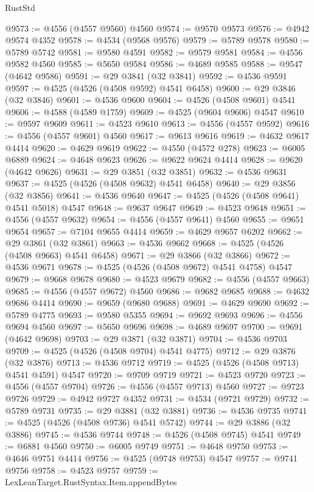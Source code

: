 \begin{lexlean}{RustStd}
\begin{coremodule}
@9573 := @4556 (@4557 @9560) @4560
@9574 := @9570 @9573
@9576 := @4942 @9574 @4352
@9578 := @4534 (@9568 @9576)
@9579 := @5789 @9578
@9580 := @5789 @5742
@9581 := @9580 @4591
@9582 := @9579 @9581
@9584 := @4556 @9582 @4560
@9585 := @5650 @9584
@9586 := @4689 @9585
@9588 := @9547 (@4642 @9586)
@9591 := @29 @3841 (@32 @3841)
@9592 := @4536 @9591
@9597 := @4525 (@4526 (@4508 @9592) @4541 @6458)
@9600 := @29 @3846 (@32 @3846)
@9601 := @4536 @9600
@9604 := @4526 (@4508 @9601) @4541
@9606 := @4588 (@4589 @1759)
@9609 := @4525 (@9604 @9606) @4547
@9610 := @9597 @9609
@9611 := @4523 @9610
@9613 := @4556 (@4557 @9592)
@9616 := @4556 (@4557 @9601) @4560
@9617 := @9613 @9616
@9619 := @4632 @9617 @4414
@9620 := @4629 @9619
@9622 := @4550 (@4572 @278)
@9623 := @6005 @6889
@9624 := @4648 @9623
@9626 := @9622 @9624 @4414
@9628 := @9620 (@4642 @9626)
@9631 := @29 @3851 (@32 @3851)
@9632 := @4536 @9631
@9637 := @4525 (@4526 (@4508 @9632) @4541 @6458)
@9640 := @29 @3856 (@32 @3856)
@9641 := @4536 @9640
@9647 := @4525 (@4526 (@4508 @9641) @4541 @5018) @4547
@9648 := @9637 @9647
@9649 := @4523 @9648
@9651 := @4556 (@4557 @9632)
@9654 := @4556 (@4557 @9641) @4560
@9655 := @9651 @9654
@9657 := @7104 @9655 @4414
@9659 := @4629 @9657 @6202
@9662 := @29 @3861 (@32 @3861)
@9663 := @4536 @9662
@9668 := @4525 (@4526 (@4508 @9663) @4541 @6458)
@9671 := @29 @3866 (@32 @3866)
@9672 := @4536 @9671
@9678 := @4525 (@4526 (@4508 @9672) @4541 @4758) @4547
@9679 := @9668 @9678
@9680 := @4523 @9679
@9682 := @4556 (@4557 @9663)
@9685 := @4556 (@4557 @9672) @4560
@9686 := @9682 @9685
@9688 := @4632 @9686 @4414
@9690 := @9659 (@9680 @9688)
@9691 := @4629 @9690
@9692 := @5789 @4775
@9693 := @9580 @5355
@9694 := @9692 @9693
@9696 := @4556 @9694 @4560
@9697 := @5650 @9696
@9698 := @4689 @9697
@9700 := @9691 (@4642 @9698)
@9703 := @29 @3871 (@32 @3871)
@9704 := @4536 @9703
@9709 := @4525 (@4526 (@4508 @9704) @4541 @4775)
@9712 := @29 @3876 (@32 @3876)
@9713 := @4536 @9712
@9719 := @4525 (@4526 (@4508 @9713) @4541 @4591) @4547
@9720 := @9709 @9719
@9721 := @4523 @9720
@9723 := @4556 (@4557 @9704)
@9726 := @4556 (@4557 @9713) @4560
@9727 := @9723 @9726
@9729 := @4942 @9727 @4352
@9731 := @4534 (@9721 @9729)
@9732 := @5789 @9731
@9735 := @29 @3881 (@32 @3881)
@9736 := @4536 @9735
@9741 := @4525 (@4526 (@4508 @9736) @4541 @5742)
@9744 := @29 @3886 (@32 @3886)
@9745 := @4536 @9744
@9748 := @4526 (@4508 @9745) @4541
@9749 := @6881 @4560
@9750 := @6005 @9749
@9751 := @4648 @9750
@9753 := @4646 @9751 @4414
@9756 := @4525 (@9748 @9753) @4547
@9757 := @9741 @9756
@9758 := @4523 @9757
@9759 := LexLeanTarget.RustSyntax.Item.appendBytes

\end{coremodule}
\end{lexlean}
